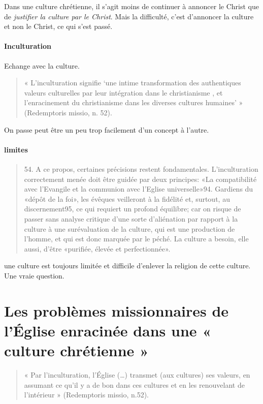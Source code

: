 Dans une culture chrétienne, il s'agit moins de continuer à annoncer le Christ que de \textit{justifier la culture par le Christ}. 
Mais la difficulté, c'est d'annoncer la culture et non le Christ, ce qui s'est passé. 


\paragraph{Inculturation} Echange avec la culture.  
\begin{quote}
     « L’inculturation signifie ‘une intime transformation des authentiques valeurs culturelles par leur intégration dans le christianisme , et l’enracinement du christianisme dans les diverses cultures humaines’ » (Redemptoris missio, n. 52). 
\end{quote}

On passe peut être un peu trop facilement d'un concept à l'autre.

\paragraph{limites}
\begin{quote}
    54. A ce propos, certaines précisions restent fondamentales. L'inculturation correctement menée doit être guidée par deux principes: «La compatibilité avec l'Evangile et la communion avec l'Eglise universelle»94. Gardiens du «dépôt de la foi», les évêques veilleront à la fidélité et, surtout, au discernement95, ce qui requiert un profond équilibre; car on risque de passer sans analyse critique d'une sorte d'aliénation par rapport à la culture à une surévaluation de la culture, qui est une production de l'homme, et qui est donc marquée par le péché. La culture a besoin, elle aussi, d'être «purifiée, élevée et perfectionnée».
\end{quote}
une culture est toujours limitée et difficile d'enlever la religion de cette culture. Une vraie question.

\section{Les problèmes missionnaires de l’Église enracinée dans une « culture chrétienne » }
\begin{quote}
      « Par l’inculturation, l’Église (…) transmet (aux cultures) ses valeurs, en assumant ce qu’il y a de bon dans ces cultures et en les renouvelant de l’intérieur » (Redemptoris missio, n.52).  
\end{quote}
 


 

 
